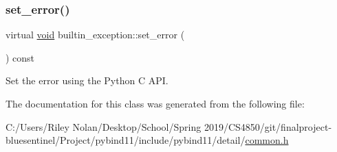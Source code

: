 \subsubsection{\texorpdfstring{set\_error()}{set\_error()}}
{\footnotesize\ttfamily virtual \mbox{\hyperlink{_s_d_l__opengles2__gl2ext_8h_ae5d8fa23ad07c48bb609509eae494c95}{void}} builtin\+\_\+exception\+::set\+\_\+error (\begin{DoxyParamCaption}{ }\end{DoxyParamCaption}) const\hspace{0.3cm}{\ttfamily [pure virtual]}}



Set the error using the Python C A\+PI. 



The documentation for this class was generated from the following file\+:\begin{DoxyCompactItemize}
\item 
C\+:/\+Users/\+Riley Nolan/\+Desktop/\+School/\+Spring 2019/\+C\+S4850/git/finalproject-\/bluesentinel/\+Project/pybind11/include/pybind11/detail/\mbox{\hyperlink{detail_2common_8h}{common.\+h}}\end{DoxyCompactItemize}
